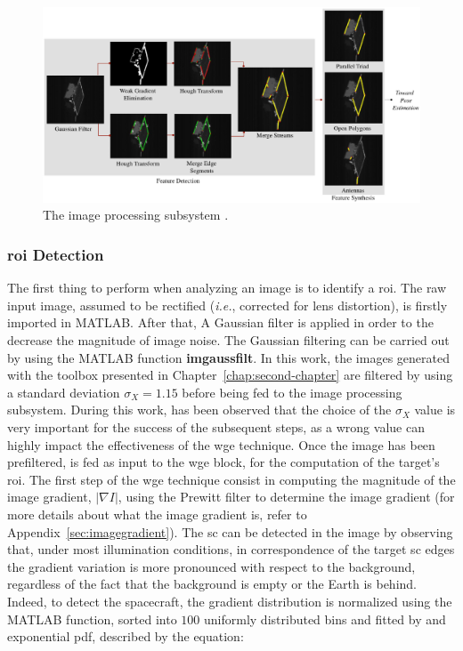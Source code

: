 \begin{figure}[htbp]
  \centering
  \includegraphics[width=1.0\textwidth]{gfx/imageProcessingSubsystem.eps}
  \caption{The image processing subsystem \cite{Sharma2018}.}
  \label{fig:imageProcessingSubsystem}
\end{figure}

\subsubsection{\acrshort{roi} Detection}
The first thing to perform when analyzing an image is to identify a \acrshort{roi}.
The raw input image, assumed to be rectified (\textit{i.e.},
corrected for lens distortion), is firstly imported in MATLAB. After that, A Gaussian filter is applied in order to the decrease the magnitude of image noise. The Gaussian filtering can be carried out by using the MATLAB function \textbf{imgaussfilt}. In this work, the images generated with the toolbox presented in Chapter~\ref{chap:second-chapter} are filtered by using a standard deviation $\sigma_X = 1.15$ before being fed to the image processing subsystem. During this work, has been observed that the choice of the $\sigma_X$ value is very important for the success of the subsequent steps, as a wrong value can highly impact the effectiveness of the \acrshort{wge} technique. Once the image has been prefiltered, is fed as input to the \acrshort{wge} block, for the computation of the target's \acrshort{roi}. The first step of the \acrshort{wge} technique consist in computing the magnitude of the image gradient, $|\nabla I|$,  using the Prewitt filter to determine the image gradient (for more details about what the image gradient is, refer to Appendix~\ref{sec:imagegradient}).
The \acrshort{sc} can be detected in the image by observing that, under most illumination conditions, in correspondence of the target \acrshort{sc} edges the gradient variation is more pronounced with respect to the background, regardless of the fact that the background is empty or the Earth is behind.
Indeed, to detect the spacecraft, the gradient distribution is normalized using the MATLAB  function, sorted into $100$ uniformly distributed bins and fitted by and exponential \acrfull{pdf}, described by the equation:

